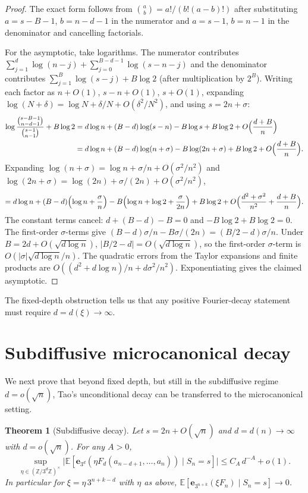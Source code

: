 \documentclass[11pt,a4paper]{amsart}
\theoremstyle{plain}
\newtheorem{theorem}{Theorem}[section]
\theoremstyle{definition}
\newcommand{\Z}{\mathbb{Z}}
\newcommand{\E}{\mathbb{E}}
\begin{document}
\begin{proof}
The exact form follows from $\binom{a}{b}=a!/(b!(a-b)!)$ after
substituting $a=s-B-1$, $b=n-d-1$ in the numerator and $a=s-1$, $b=n-1$
in the denominator and cancelling factorials.

For the asymptotic, take logarithms.
The numerator contributes
$\sum_{j=1}^d\log(n-j)+\sum_{j=0}^{B-d-1}\log(s-n-j)$
and the denominator contributes $\sum_{j=1}^B\log(s-j)+B\log 2$
(after multiplication by $2^B$).
Writing each factor as $n+O(1)$, $s-n+O(1)$, $s+O(1)$, expanding
$\log(N+\delta)=\log N+\delta/N+O(\delta^2/N^2)$,
and using $s=2n+\sigma$:
\begin{align*}
\log\frac{\binom{s-B-1}{n-d-1}}{\binom{s-1}{n-1}}+B\log 2
&=d\log n+(B-d)\log(s-n)-B\log s+B\log 2+O\Bigl(\frac{d+B}{n}\Bigr)\\
&=d\log n+(B-d)\log(n+\sigma)-B\log(2n+\sigma)+B\log 2+O\Bigl(\frac{d+B}{n}\Bigr).
\end{align*}
Expanding $\log(n+\sigma)=\log n+\sigma/n+O(\sigma^2/n^2)$ and
$\log(2n+\sigma)=\log(2n)+\sigma/(2n)+O(\sigma^2/n^2)$,
$$
=d\log n+(B-d)\Bigl(\log n+\frac{\sigma}{n}\Bigr)
-B\Bigl(\log n+\log 2+\frac{\sigma}{2n}\Bigr)+B\log 2+O\Bigl(\frac{d^2+\sigma^2}{n^2}+\frac{d+B}{n}\Bigr).
$$
The constant terms cancel: $d+(B-d)-B=0$ and $-B\log 2+B\log 2=0$.
The first-order $\sigma$-terms give $(B-d)\sigma/n-B\sigma/(2n)=(B/2-d)\sigma/n$.
Under $B=2d+O(\sqrt{d\log n})$, $|B/2-d|=O(\sqrt{d\log n})$, so the
first-order $\sigma$-term is $O(|\sigma|\sqrt{d\log n}/n)$.
The quadratic errors from the Taylor expansions and finite products are
$O((d^2+d\log n)/n+d\sigma^2/n^2)$.
Exponentiating gives the claimed asymptotic.
\end{proof}

The fixed-depth obstruction tells us that any positive Fourier-decay
statement must require $d=d(\xi)\to\infty$.

\section{Subdiffusive microcanonical decay}\label{sec:subdiff}

We next prove that beyond fixed depth, but still in the subdiffusive regime
$d=o(\sqrt n)$, Tao's unconditional decay can be transferred to the
microcanonical setting.

\begin{theorem}[Subdiffusive decay]\label{thm:D}
Let $s=2n+O(\sqrt n)$ and $d=d(n)\to\infty$ with $d=o(\sqrt n)$.
For any $A>0$,
$$
\sup_{\eta\in(\Z/3^d\Z)^\times}
\bigl|\E[\mathbf e_{3^d}(\eta F_d(a_{n-d+1},\dots,a_n))\mid S_n=s]\bigr|
\le C_A\,d^{-A}+o(1).
$$
In particular for $\xi=\eta\,3^{n+k-d}$ with $\eta$ as above,
$\E[\mathbf e_{3^{n+k}}(\xi F_n)\mid S_n=s]\to0$.
\end{theorem}
\end{document}

